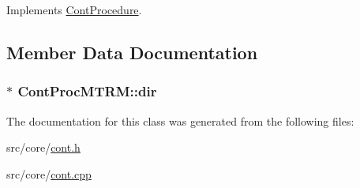 Implements \hyperlink{a00067_a7f7adefe250a00b3778669ef649f03ac}{Cont\-Procedure}.



\subsection{Member Data Documentation}
\hypertarget{a00079_a8c4e843c8734fcbcbde7982f4152589f}{
\subsubsection[{dir}]{$\ast$ Cont\-Proc\-M\-T\-R\-M\-::dir\hspace{0.3cm}{\ttfamily [private]}}}\label{a00079_a8c4e843c8734fcbcbde7982f4152589f}


The documentation for this class was generated from the following files\-:\begin{DoxyCompactItemize}
\item 
src/core/\hyperlink{a00218}{cont.\-h}\item 
src/core/\hyperlink{a00217}{cont.\-cpp}\end{DoxyCompactItemize}
